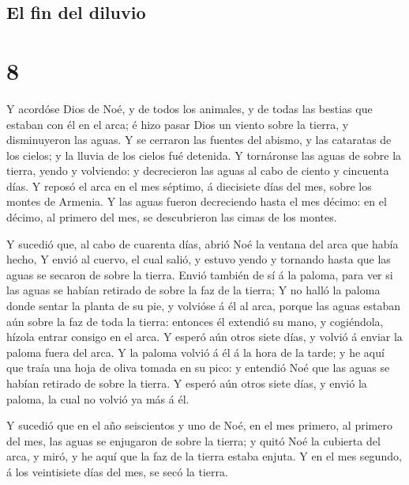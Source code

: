 \hypertarget{el-fin-del-diluvio}{%
\subsection{El fin del diluvio}\label{el-fin-del-diluvio}}

\hypertarget{section-7}{%
\section{8}\label{section-7}}

 Y acordóse Dios de Noé, y de todos los animales, y de
todas las bestias que estaban con él en el arca; é hizo pasar Dios un
viento sobre la tierra, y disminuyeron las aguas.  Y se
cerraron las fuentes del abismo, y las cataratas de los cielos; y la
lluvia de los cielos fué detenida.  Y tornáronse las aguas
de sobre la tierra, yendo y volviendo: y decrecieron las aguas al cabo
de ciento y cincuenta días.  Y reposó el arca en el mes
séptimo, á diecisiete días del mes, sobre los montes de Armenia.
 Y las aguas fueron decreciendo hasta el mes décimo: en el
décimo, al primero del mes, se descubrieron las cimas de los montes.

 Y sucedió que, al cabo de cuarenta días, abrió Noé la
ventana del arca que había hecho,  Y envió al cuervo, el
cual salió, y estuvo yendo y tornando hasta que las aguas se secaron de
sobre la tierra.  Envió también de sí á la paloma, para
ver si las aguas se habían retirado de sobre la faz de la tierra;
 Y no halló la paloma donde sentar la planta de su pie, y
volvióse á él al arca, porque las aguas estaban aún sobre la faz de toda
la tierra: entonces él extendió su mano, y cogiéndola, hízola entrar
consigo en el arca.  Y esperó aún otros siete días, y
volvió á enviar la paloma fuera del arca.  Y la paloma
volvió á él á la hora de la tarde; y he aquí que traía una hoja de oliva
tomada en su pico: y entendió Noé que las aguas se habían retirado de
sobre la tierra.  Y esperó aún otros siete días, y envió
la paloma, la cual no volvió ya más á él.

 Y sucedió que en el año seiscientos y uno de Noé, en el
mes primero, al primero del mes, las aguas se enjugaron de sobre la
tierra; y quitó Noé la cubierta del arca, y miró, y he aquí que la faz
de la tierra estaba enjuta.  Y en el mes segundo, á los
veintisiete días del mes, se secó la tierra.

